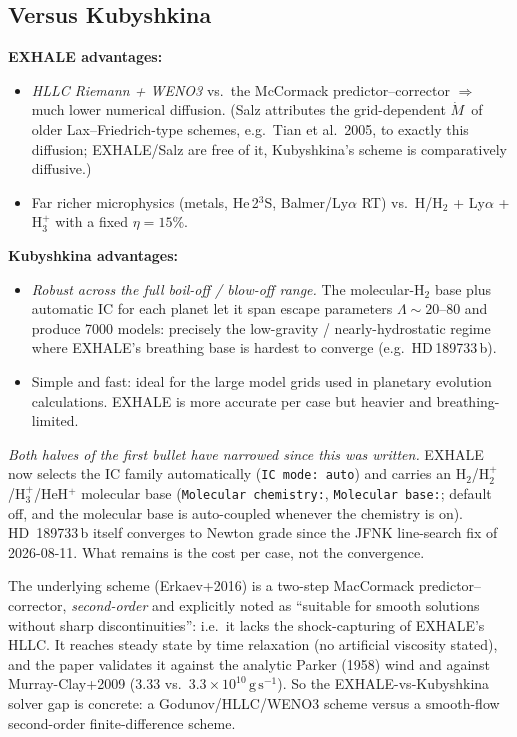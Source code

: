 \documentclass[english,a4paper]{my_memo}
\newcommand{\Mdot}{$\dot M$}
\begin{document}
\subsection{Versus Kubyshkina}

\textbf{EXHALE advantages:}
\begin{itemize}
\item \emph{HLLC Riemann + WENO3} vs.\ the McCormack predictor--corrector
  $\Rightarrow$ much lower numerical diffusion. (Salz attributes the
  grid-dependent \Mdot\ of older Lax--Friedrich-type schemes, e.g.\ Tian
  et al.\ 2005, to exactly this diffusion; EXHALE/Salz are free of it,
  Kubyshkina's scheme is comparatively diffusive.)
\item Far richer microphysics (metals, He\,2$^3$S, Balmer/Ly$\alpha$ RT)
  vs.\ H/H$_2$ + Ly$\alpha$ + H$_3^+$ with a fixed $\eta=15\%$.
\end{itemize}

\textbf{Kubyshkina advantages:}
\begin{itemize}
\item \emph{Robust across the full boil-off / blow-off range.} The
  molecular-H$_2$ base plus automatic IC for each planet let it span escape
  parameters $\Lambda\sim20$--$80$ and produce 7000 models: precisely
  the low-gravity / nearly-hydrostatic regime where EXHALE's breathing
  base is hardest to converge (e.g.\ HD\,189733\,b).
\item Simple and fast: ideal for the large model grids used in planetary
  evolution calculations. EXHALE is more accurate per case but heavier
  and breathing-limited.
\end{itemize}

\noindent\emph{Both halves of the first bullet have narrowed since this was
written.} EXHALE now selects the IC family automatically
(\texttt{IC mode: auto}) and carries an H$_2$/H$_2^+$/H$_3^+$/HeH$^+$
molecular base (\texttt{Molecular chemistry:}, \texttt{Molecular base:};
default off, and the molecular base is auto-coupled whenever the chemistry
is on).  HD~189733\,b itself converges to Newton grade since the JFNK
line-search fix of 2026-08-11.  What remains is
the cost per case, not the convergence.

The underlying scheme (Erkaev+2016) is a two-step MacCormack
predictor--corrector, \emph{second-order} and explicitly noted as
``suitable for smooth solutions without sharp discontinuities'': i.e.\
it lacks the shock-capturing of EXHALE's HLLC. It reaches steady state by
time relaxation (no artificial viscosity stated), and the paper validates
it against the analytic Parker (1958) wind and against Murray-Clay+2009
($3.33$ vs.\ $3.3\times10^{10}\,\mathrm{g\,s^{-1}}$). So the
EXHALE-vs-Kubyshkina solver gap is concrete: a Godunov/HLLC/WENO3 scheme
versus a smooth-flow second-order finite-difference scheme.
\end{document}
